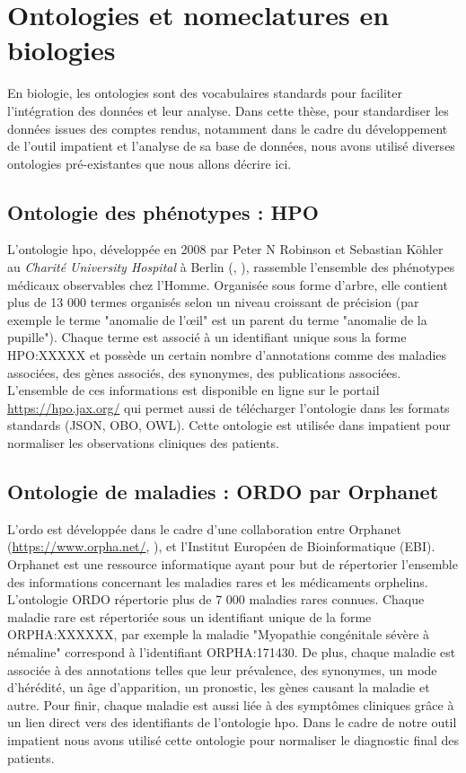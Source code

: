 \section{Ontologies et nomeclatures en biologies}\label{mat_met_onto}
En biologie, les ontologies sont des vocabulaires standards pour faciliter l'intégration des données et leur analyse. Dans cette thèse, pour standardiser les données issues des comptes rendus, notamment dans le cadre du développement de l'outil \gls{impatient} et l'analyse de sa base de données, nous avons utilisé diverses ontologies pré-existantes que nous allons décrire ici.

\subsection{Ontologie des phénotypes : HPO}
L'ontologie \gls{hpo}, développée en 2008 par Peter N Robinson et Sebastian Köhler au \textit{Charité University Hospital} à Berlin (\cite{robinson_human_2008}, \cite{kohler_human_2021}), rassemble l'ensemble des phénotypes médicaux observables chez l'Homme. Organisée sous forme d'arbre, elle contient plus de 13 000 termes organisés selon un niveau croissant de précision (par exemple le terme "anomalie de l'œil" est un parent du terme "anomalie de la pupille"). Chaque terme est associé à un identifiant unique sous la forme HPO:XXXXX et possède un certain nombre d’annotations comme des maladies associées, des gènes associés, des synonymes, des publications associées. L'ensemble de ces informations est disponible en ligne sur le portail \url{https://hpo.jax.org/} qui permet aussi de télécharger l'ontologie dans les formats standards (JSON, OBO, OWL). Cette ontologie est utilisée dans \gls{impatient} pour normaliser les observations cliniques des patients.

\subsection{Ontologie de maladies : ORDO par Orphanet}
L'\gls{ordo} est développée dans le cadre d'une collaboration entre Orphanet (\url{https://www.orpha.net/}, \cite{maiella_orphanet_2013}), et l'Institut Européen de Bioinformatique (EBI). Orphanet est une ressource informatique ayant pour but de répertorier l'ensemble des informations concernant les maladies rares et les médicaments orphelins. L'ontologie ORDO répertorie plus de 7 000 maladies rares connues. Chaque maladie rare est répertoriée sous un identifiant unique de la forme ORPHA:XXXXXX, par exemple la maladie "Myopathie congénitale sévère à némaline" correspond à l'identifiant ORPHA:171430. De plus, chaque maladie est associée à des annotations telles que leur prévalence, des synonymes, un mode d'hérédité, un âge d'apparition, un pronostic, les gènes causant la maladie et autre. Pour finir, chaque maladie est aussi liée à des symptômes cliniques grâce à un lien direct vers des identifiants de l'ontologie \gls{hpo}. Dans le cadre de notre outil \gls{impatient} nous avons utilisé cette ontologie pour normaliser le diagnostic final des patients.

